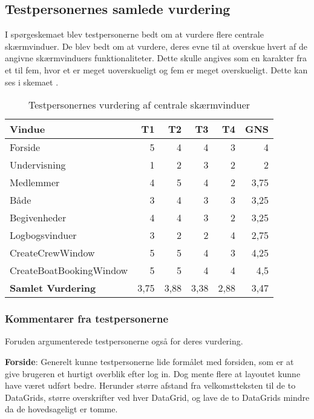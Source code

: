 \subsection{Testpersonernes samlede vurdering}

I spørgeskemaet blev testpersonerne bedt om at vurdere flere centrale skærmvinduer.
De blev bedt om at vurdere, deres evne til at overskue hvert af de angivne skærmvinduers funktionaliteter.
Dette skulle angives som en karakter fra et til fem, hvor et er meget uoverskueligt og fem er meget overskueligt.
Dette kan ses i skemaet .

\begin{table}[htbp]
    \centering
    \caption{Testpersonernes vurdering af centrale skærmvinduer}
    \begin{tabular}{l|rrrr|r}
        \toprule
        \textbf{Vindue} & T1 & T2 & T3 & T4 & \textbf{GNS} \\
        \midrule
        Forside & 5 & 4 & 4 & 3 & 4 \\
        Undervisning & 1 & 2 & 3 & 2 & 2 \\
        Medlemmer & 4 & 5 & 4 & 2 & 3,75 \\
        Både & 3 & 4 & 3 & 3 & 3,25 \\
        Begivenheder & 4 & 4 & 3 & 2 & 3,25 \\
        Logbogsvinduer & 3 & 2 & 2 & 4 & 2,75 \\
        CreateCrewWindow & 5 & 5 & 4 & 3 & 4,25 \\
        CreateBoatBookingWindow & 5 & 5 & 4 & 4 & 4,5 \\ \hline
        \textbf{Samlet Vurdering} & 3,75 & 3,88 & 3,38 & 2,88 & 3,47 \\
    \end{tabular}%
    \label{tab:vurderingtest}%
\end{table}%

\subsubsection*{Kommentarer fra testpersonerne}
Foruden  argumenterede testpersonerne også for deres vurdering.

\textbf{Forside}: 
Generelt kunne testpersonerne lide formålet med forsiden, som er at give brugeren et hurtigt overblik efter log in. 
Dog mente flere at layoutet kunne have været udført bedre.
Herunder større afstand fra velkomstteksten til de to DataGrids, større overskrifter ved hver DataGrid, og lave de to DataGrids mindre da de hovedsageligt er tomme. 

